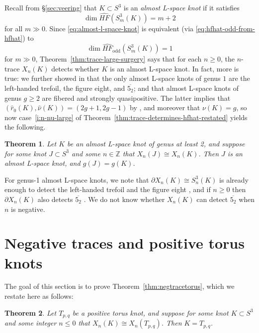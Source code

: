 \documentclass[11pt]{amsart}
\newtheorem {theorem}{Theorem}
\numberwithin{equation}{section}
\numberwithin{theorem}{section}
\theoremstyle{definition}
\newcommand{\Z}{\mathbb{Z}}
\newcommand{\hfhat}{\widehat{\mathit{HF}}}
\newcommand{\godd}{\mathrm{odd}}
\newcommand{\mirror}[1]{\overline{#1}}
\begin{document}
Recall from \S\ref{sec:veering} that $K \subset S^3$ is an \emph{almost L-space knot} if it satisfies
\begin{equation} \label{eq:almost-l-space-knot}
\dim \hfhat(S^3_m(K)) = m+2
\end{equation}
for all $m \gg 0$.  Since \eqref{eq:almost-l-space-knot} is equivalent (via \eqref{eq:hfhat-odd-from-hfhat}) to \[\dim \hfhat_\godd(S^3_m(K)) = 1\] for $m \gg 0$, Theorem~\ref{thm:trace-large-surgery} says that for each $n\geq 0$, the $n$-trace $X_n(K)$ detects whether $K$ is an almost L-space knot.    In fact, more is true: we further showed in \cite[Theorem~1.11]{bs-characterizing} that the only almost L-space knots of genus $1$ are the left-handed trefoil, the figure eight, and $\mirror{5_2}$; and that almost L-space knots of genus $g\geq 2$ are fibered and strongly quasipositive.  The latter implies that $(\hat{r}_0(K),\hat\nu(K))=(2g+1,2g-1)$ by \cite[Corollary~3.11]{bs-characterizing}, and moreover that $\nu(K) = g$, so now case~\eqref{i:n-nu-large} of Theorem~\ref{thm:trace-determines-hfhat-restated} yields the following.

\begin{theorem} \label{thm:almost-l-space}
Let $K$ be an almost L-space knot of genus at least 2, and suppose for some knot $J \subset S^3$ and some $n\in\Z$ that $X_n(J) \cong X_n(K)$.  Then $J$ is an almost L-space knot, and $g(J)=g(K)$.
\end{theorem}

For genus-1 almost L-space knots, we note that $\partial X_n(K) \cong S^3_n(K)$ is already enough to detect the left-handed trefoil and the figure eight \cite{osz-characterizing}, and if $n \geq 0$ then $\partial X_n(K)$ also detects $\mirror{5_2}$ \cite{bs-characterizing}.  We do not know whether $X_n(K)$ can detect $\mirror{5_2}$ when $n$ is negative.

%
%
%
%
%

\section{Negative traces and positive torus knots} \label{sec:torus-surgeries}
The goal of this section is to prove Theorem~\ref{thm:negtracetorus}, which we restate here as follows:

\begin{theorem} \label{thm:negtracetorus-restated}
Let $T_{p,q}$ be a positive torus knot, and suppose for some knot $K \subset S^3$ and some integer $n \leq 0$ that $X_n(K) \cong X_n(T_{p,q})$.  Then $K = T_{p,q}$.
\end{theorem}
\end{document}
